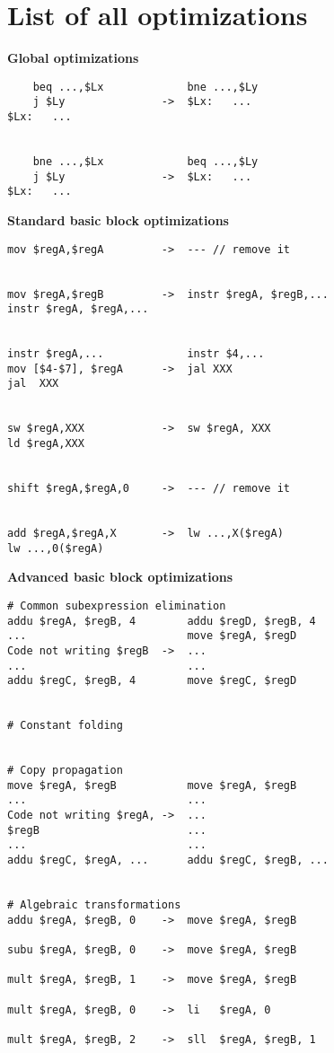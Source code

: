 \documentclass[10pt,a4paper]{article}
\begin{document}
\appendix

\section{List of all optimizations}

\label{opt}

\textbf{Global optimizations}

\begin{verbatim}
    beq ...,$Lx             bne ...,$Ly
    j $Ly               ->  $Lx:   ...
$Lx:   ...


    bne ...,$Lx             beq ...,$Ly
    j $Ly               ->  $Lx:   ...
$Lx:   ...
\end{verbatim}
\textbf{Standard basic block optimizations}

\begin{verbatim}
mov $regA,$regA         ->  --- // remove it


mov $regA,$regB         ->  instr $regA, $regB,...
instr $regA, $regA,...


instr $regA,...             instr $4,...
mov [$4-$7], $regA      ->  jal XXX
jal  XXX


sw $regA,XXX            ->  sw $regA, XXX
ld $regA,XXX


shift $regA,$regA,0     ->  --- // remove it


add $regA,$regA,X       ->  lw ...,X($regA)
lw ...,0($regA)
\end{verbatim}
\textbf{Advanced basic block optimizations}

\begin{verbatim}
# Common subexpression elimination
addu $regA, $regB, 4        addu $regD, $regB, 4
...                         move $regA, $regD
Code not writing $regB  ->  ...
...                         ...
addu $regC, $regB, 4        move $regC, $regD


# Constant folding


# Copy propagation
move $regA, $regB           move $regA, $regB
...                         ...
Code not writing $regA, ->  ...
$regB                       ...
...                         ...
addu $regC, $regA, ...      addu $regC, $regB, ...


# Algebraic transformations
addu $regA, $regB, 0    ->  move $regA, $regB

subu $regA, $regB, 0    ->  move $regA, $regB

mult $regA, $regB, 1    ->  move $regA, $regB

mult $regA, $regB, 0    ->  li   $regA, 0

mult $regA, $regB, 2    ->  sll  $regA, $regB, 1
\end{verbatim}
\end{document}
